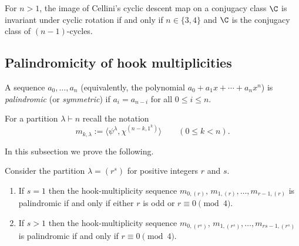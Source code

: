 \begin{conjecture} 
    For $n > 1$, the image of Cellini's cyclic descent map on a conjugacy class $\C$ is invariant under cyclic rotation if and only if $n \in \{3,4\}$ and $\C$ is the conjugacy class of $(n-1)$-cycles.
\end{conjecture}


\subsection{Palindromicity of hook multiplicities}
\label{sec:palindrom}	

A sequence $a_0,\ldots,a_n$ (equivalently, the polynomial $a_0+a_1x+\cdots+a_nx^n$) is 	
{\em palindromic} (or {\em symmetric})
if $a_i=a_{n-i}$ for all $0 \le i \le n$. 

For a partition $\lambda\vdash n$ recall the notation
\[
    m_{k,\lambda}
    := \langle \psi^{\lambda},\chi^{(n-k,1^k)} \rangle 
    \qquad (0\le k<n).
\]

In this subsection we prove the following. 

\begin{proposition}\label{conj:r2}
    Consider the partition $\lambda = (r^s)$ for positive integers $r$ and $s$.
    \begin{enumerate}
        \item 
        If $s=1$ then the hook-multiplicity sequence  $m_{0,(r)},\,m_{1,(r)},\ldots, m_{r-1,(r)}$ is palindromic if and only if either $r$ is odd or $r\equiv 0 \pmod 4$. 

        \item
        If $s>1$ then the hook-multiplicity sequence $m_{0,(r^s)},\,m_{1,(r^s)},\ldots, m_{rs-1,(r^s)}$ is palindromic if and only if $r\equiv 0 \pmod 4$.
    \end{enumerate}
\end{proposition}

